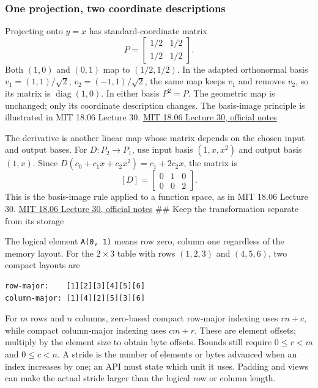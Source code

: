 \subsubsection{One projection, two coordinate descriptions}\label{01-foundations-i-ch018-one-projection-two-coordinate-descriptions}

\hypertarget{01-foundations-i-ch018-one-projection-two-coordinate-descriptions}{}

Projecting onto \(y=x\) has standard-coordinate matrix \[
P=\begin{bmatrix}1/2&1/2\\1/2&1/2\end{bmatrix}.
\] Both \((1,0)\) and \((0,1)\) map to \((1/2,1/2)\). In the adapted orthonormal basis \(v_1=(1,1)/\sqrt2\), \(v_2=(-1,1)/\sqrt2\), the same map keeps \(v_1\) and removes \(v_2\), so its matrix is \(\operatorname{diag}(1,0)\). In either basis \(P^2=P\). The geometric map is unchanged; only its coordinate description changes. The basis-image principle is illustrated in MIT 18.06 Lecture 30. \href{https://ocw.mit.edu/courses/18-06-linear-algebra-spring-2010/71bffaffa75c005516ee010daf17868b_MIT18_06S10_L30.pdf}{MIT 18.06 Lecture 30, official notes}

The derivative is another linear map whose matrix depends on the chosen input and output bases. For \(D:P_2\to P_1\), use input basis \((1,x,x^2)\) and output basis \((1,x)\). Since \(D(c_0+c_1x+c_2x^2)=c_1+2c_2x\), the matrix is \[
[D]=\begin{bmatrix}0&1&0\\0&0&2\end{bmatrix}.
\] This is the basis-image rule applied to a function space, as in MIT 18.06 Lecture 30. \href{https://ocw.mit.edu/courses/18-06-linear-algebra-spring-2010/71bffaffa75c005516ee010daf17868b_MIT18_06S10_L30.pdf}{MIT 18.06 Lecture 30, official notes} \#\# Keep the transformation separate from its storage

The logical element \texttt{A(0,\ 1)} means row zero, column one regardless of the memory layout. For the \(2\times3\) table with rows \((1,2,3)\) and \((4,5,6)\), two compact layouts are

\begin{verbatim}
row-major:    [1][2][3][4][5][6]
column-major: [1][4][2][5][3][6]
\end{verbatim}

For \(m\) rows and \(n\) columns, zero-based compact row-major indexing uses \(rn+c\), while compact column-major indexing uses \(cm+r\). These are element offsets; multiply by the element size to obtain byte offsets. Bounds still require \(0\le r<m\) and \(0\le c<n\). A stride is the number of elements or bytes advanced when an index increases by one; an API must state which unit it uses. Padding and views can make the actual stride larger than the logical row or column length.

